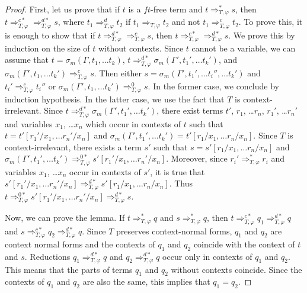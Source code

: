 \documentclass[reqno]{amsart}
\theoremstyle{definition}
\theoremstyle{remark}
\newcommand{\ft}{\mathit{ft}}
\numberwithin{figure}{section}
\begin{document}
\begin{proof}
First, let us prove that if $t$ is a $\ft$-free term and $t \Rightarrow_{T,\varphi}^* s$, then $t \Rightarrow_{T,\varphi}^{c*} \Rightarrow_{T,\varphi}^{d*} s$,
where $t_1 \Rightarrow_{T,\varphi}^d t_2$ if $t_1 \Rightarrow_{T,\varphi} t_2$ and not $t_1 \Rightarrow_{T,\varphi}^c t_2$.
To prove this, it is enough to show that if $t \Rightarrow_{T,\varphi}^{d*} \Rightarrow_{T,\varphi}^c s$, then $t \Rightarrow_{T,\varphi}^{c*} \Rightarrow_{T,\varphi}^{d*} s$.
We prove this by induction on the size of $t$ without contexts.
Since $t$ cannot be a variable, we can assume that $t = \sigma_m(\Gamma, t_1, \ldots t_k)$, $t \Rightarrow_{T,\varphi}^{d*} \sigma_m(\Gamma', t_1', \ldots t_k')$, and $\sigma_m(\Gamma', t_1, \ldots t_k') \Rightarrow_{T,\varphi}^c s$.
Then either $s = \sigma_m(\Gamma', t_1', \ldots t_i'', \ldots t_k')$ and $t_i' \Rightarrow_{T,\varphi}^c t_i''$ or $\sigma_m(\Gamma', t_1, \ldots t_k') \Rightarrow_{T,\varphi}^0 s$.
In the former case, we conclude by induction hypothesis.
In the latter case, we use the fact that $T$ is context-irrelevant.
Since $t \Rightarrow_{T,\varphi}^{d*} \sigma_m(\Gamma', t_1', \ldots t_k')$, there exist terms $t'$, $r_1$, \ldots $r_n$, $r_1'$, \ldots $r_n'$ and variables $x_1$, \ldots $x_n$ which occur in contexts of $t$
such that $t = t'[r_1'/x_1, \ldots r_n'/x_n]$ and $\sigma_m(\Gamma', t_1', \ldots t_k') = t'[r_1/x_1, \ldots r_n/x_n]$.
Since $T$ is context-irrelevant, there exists a term $s'$ such that $s = s'[r_1/x_1, \ldots r_n/x_n]$ and $\sigma_m(\Gamma', t_1', \ldots t_k') \Rightarrow_{T,\varphi}^{0*} s'[r_1'/x_1, \ldots r_n'/x_n]$.
Moreover, since $r_i' \Rightarrow_{T,\varphi}^* r_i$ and variables $x_1$, \ldots $x_n$ occur in contexts of $s'$, it is true that $s'[r_1'/x_1, \ldots r_n'/x_n] \Rightarrow_{T,\varphi}^{d*} s'[r_1/x_1, \ldots r_n/x_n]$.
Thus $t \Rightarrow_{T,\varphi}^{0*} s'[r_1'/x_1, \ldots r_n'/x_n] \Rightarrow_{T,\varphi}^{d*} s$.

Now, we can prove the lemma.
If $t \Rightarrow_{T,\varphi}^* q$ and $s \Rightarrow_{T,\varphi}^* q$, then $t \Rightarrow_{T,\varphi}^{c*} q_1 \Rightarrow_{T,\varphi}^{d*} q$ and $s \Rightarrow_{T,\varphi}^{c*} q_2 \Rightarrow_{T,\varphi}^{d*} q$.
Since $T$ preserves context-normal forms, $q_1$ and $q_2$ are context normal forms and the contexts of $q_1$ and $q_2$ coincide with the context of $t$ and $s$.
Reductions $q_1 \Rightarrow_{T,\varphi}^{d*} q$ and $q_2 \Rightarrow_{T,\varphi}^{d*} q$ occur only in contexts of $q_1$ and $q_2$.
This means that the parts of terms $q_1$ and $q_2$ without contexts coincide.
Since the contexts of $q_1$ and $q_2$ are also the same, this implies that $q_1 = q_2$.
\end{proof}
\end{document}
